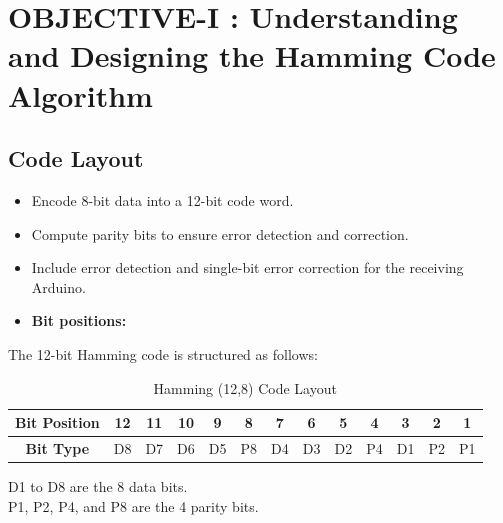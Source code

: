 \documentclass{article}
\begin{document}
   

\section{OBJECTIVE-I : Understanding and Designing the Hamming Code Algorithm}
\subsection{Code Layout}
\begin{itemize}
\item Encode 8-bit data into a 12-bit code word.
\item Compute parity bits to ensure error detection and correction.
\item Include error detection and single-bit error correction for the receiving Arduino.
\item \textbf{Bit positions: }
\end{itemize}
The 12-bit Hamming code is structured as follows:

    \begin{table}[h!]
        \centering
        \caption{Hamming (12,8) Code Layout}
        \begin{tabular}{|c|c|c|c|c|c|c|c|c|c|c|c|c|}
            \hline
            \textbf{Bit Position} & 12 & 11 & 10 & 9 & 8 & 7 & 6 & 5 & 4 & 3 & 2 & 1 \\
            \hline
            \textbf{Bit Type} & D8 & D7 & D6 & D5 & P8 & D4 & D3 & D2 & P4 & D1 & P2 & P1 \\
            \hline
        \end{tabular}
        
    \end{table}
     D1 to D8 are the 8 data bits.\\
     P1, P2, P4, and P8 are the 4 parity bits. 
\end{document}

